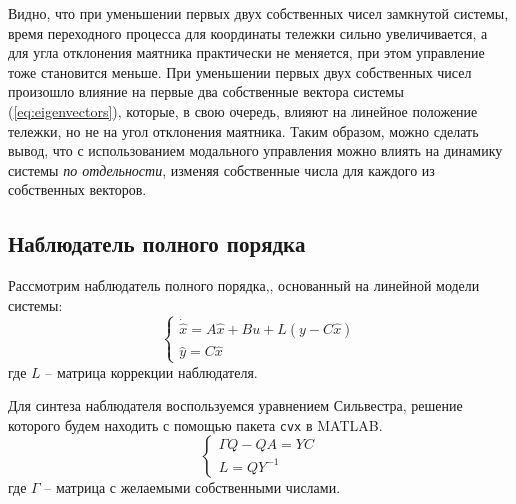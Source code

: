 Видно, что при уменьшении первых двух собственных чисел замкнутой системы, время переходного процесса для 
координаты тележки сильно увеличивается, а для угла отклонения маятника практически не меняется, при этом 
управление тоже становится меньше. При уменьшении первых двух собственных чисел произошло влияние на первые 
два собственные вектора системы (\ref{eq:eigenvectors}), которые, в свою очередь, влияют на 
линейное положение тележки, но не на угол отклонения маятника. Таким образом, можно сделать вывод, что 
с использованием модального управления можно влиять на динамику системы \textit{по отдельности}, изменяя 
собственные числа для каждого из собственных векторов.

\subsection{Наблюдатель полного порядка}
Рассмотрим наблюдатель полного порядка,, основанный на линейной модели системы: 
\begin{equation}
    \begin{cases}
        \dot{\hat{x}} = A\hat{x} + Bu + L(y - C\hat{x})\\
        \hat{y} = C\hat{x}
    \end{cases}
\end{equation}
где $L$ -- матрица коррекции наблюдателя. 

Для синтеза наблюдателя воспользуемся уравнением Сильвестра, решение которого будем находить с помощью
пакета \texttt{cvx} в MATLAB.
\begin{equation}
    \begin{cases}
        \Gamma Q - QA = YC \\ 
        L = QY^{-1}
    \end{cases}
\end{equation}
где $\Gamma$ -- матрица с желаемыми собственными числами. 

